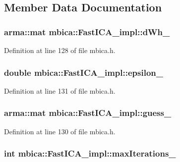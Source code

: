 \subsection{Member Data Documentation}
\hypertarget{classmbica_1_1_fast_i_c_a__impl_ab1733850788ffd4118563e443cbd12bf}{
\subsubsection[{dWh\_\-}]{\setlength{\rightskip}{0pt plus 5cm}arma::mat {\bf mbica::FastICA\_\-impl::dWh\_\-}}}
\label{classmbica_1_1_fast_i_c_a__impl_ab1733850788ffd4118563e443cbd12bf}


Definition at line 128 of file mbica.h.

\hypertarget{classmbica_1_1_fast_i_c_a__impl_a286ddf4b806607c6b1ff2c01638b562f}{
\subsubsection[{epsilon\_\-}]{\setlength{\rightskip}{0pt plus 5cm}double {\bf mbica::FastICA\_\-impl::epsilon\_\-}}}
\label{classmbica_1_1_fast_i_c_a__impl_a286ddf4b806607c6b1ff2c01638b562f}


Definition at line 131 of file mbica.h.

\hypertarget{classmbica_1_1_fast_i_c_a__impl_a44e32ead6a78e76dadddd503732bed29}{
\subsubsection[{guess\_\-}]{\setlength{\rightskip}{0pt plus 5cm}arma::mat {\bf mbica::FastICA\_\-impl::guess\_\-}}}
\label{classmbica_1_1_fast_i_c_a__impl_a44e32ead6a78e76dadddd503732bed29}


Definition at line 130 of file mbica.h.

\hypertarget{classmbica_1_1_fast_i_c_a__impl_a33dc4e8644810412d57896fbcd9aed91}{
\subsubsection[{maxIterations\_\-}]{\setlength{\rightskip}{0pt plus 5cm}int {\bf mbica::FastICA\_\-impl::maxIterations\_\-}}}
\label{classmbica_1_1_fast_i_c_a__impl_a33dc4e8644810412d57896fbcd9aed91}


